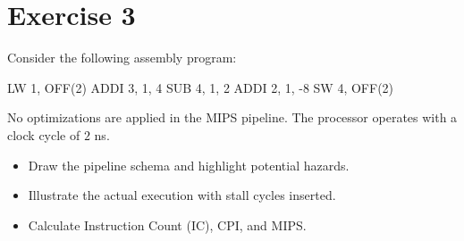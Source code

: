 \section{Exercise 3}

Consider the following assembly program: 
\begin{verbnobox}[\verbarg]
LW 1, OFF(2)
ADDI 3, 1, 4
SUB 4, 1, 2
ADDI 2, 1, -8
SW 4, OFF(2)
\end{verbnobox}
No optimizations are applied in the MIPS pipeline. 
The processor operates with a clock cycle of $2$ ns. 
\begin{itemize}
    \item Draw the pipeline schema and highlight potential hazards.
    \item Illustrate the actual execution with stall cycles inserted.
    \item Calculate Instruction Count (IC), CPI, and MIPS.
\end{itemize}

